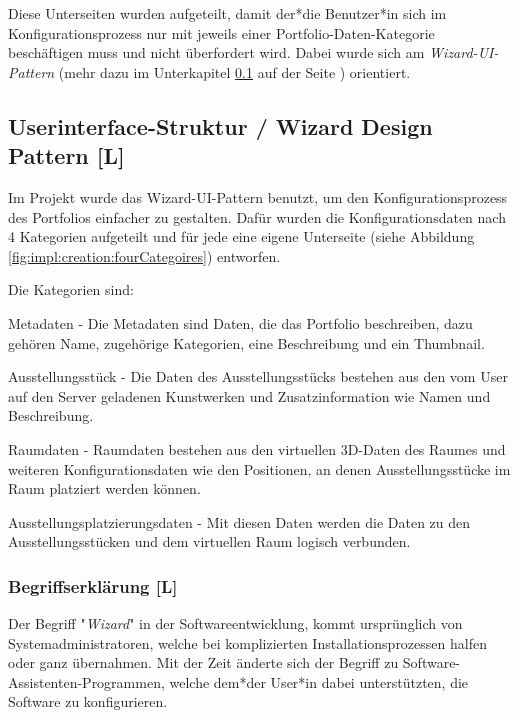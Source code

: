 Diese Unterseiten wurden aufgeteilt, damit der*die Benutzer*in sich im Konfigurationsprozess nur mit jeweils einer Portfolio-Daten-Kategorie beschäftigen muss und nicht überfordert wird. Dabei wurde sich  am \emph{Wizard-UI-Pattern} (mehr dazu im Unterkapitel \ref{sec::contentcreation::wizard} auf der Seite \pageref{sec::contentcreation::wizard}) orientiert.

\subsection{Userinterface-Struktur / Wizard Design Pattern [L]}
\label{sec::contentcreation::wizard}
Im Projekt wurde das Wizard-UI-Pattern benutzt, um den Konfigurationsprozess des Portfolios einfacher zu gestalten. Dafür wurden die Konfigurationsdaten nach 4 Kategorien aufgeteilt und für jede eine eigene Unterseite (siehe Abbildung \ref{fig:impl:creation:fourCategoires}) entworfen.

Die Kategorien sind:
\begin{compactitem}
\item Metadaten - Die Metadaten sind Daten, die das Portfolio beschreiben, dazu gehören Name, zugehörige Kategorien, eine Beschreibung und ein Thumbnail.
\item Ausstellungsstück - Die Daten des Ausstellungsstücks bestehen aus den vom User auf den Server geladenen Kunstwerken und Zusatzinformation wie Namen und Beschreibung.
\item Raumdaten - Raumdaten bestehen aus den virtuellen 3D-Daten des Raumes und weiteren Konfigurationsdaten wie den Positionen, an denen Ausstellungsstücke im Raum platziert werden können.
\item Ausstellungsplatzierungsdaten - Mit diesen Daten werden die Daten zu den Ausstellungsstücken und dem virtuellen Raum logisch verbunden.
\end{compactitem}

\subsubsection*{Begriffserklärung [L]}
Der Begriff "\emph{Wizard}" in der Softwareentwicklung, kommt ursprünglich von Systemadministratoren, welche bei komplizierten Installationsprozessen halfen oder ganz übernahmen. Mit der Zeit änderte sich der Begriff zu Software-Assistenten-Programmen, welche dem*der User*in dabei unterstützten, die Software zu konfigurieren. \cite[Ursprung des Begriffs Wizard]{OrigionOfWizards}

